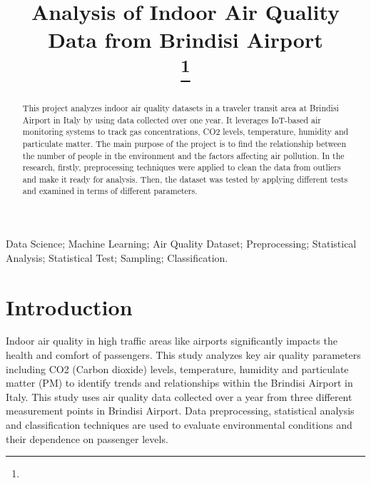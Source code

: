 \documentclass[conference]{IEEEtran}
\begin{document}
\title{Analysis of Indoor Air Quality Data from Brindisi Airport \\
{\footnotesize \textsuperscript{}
}
\thanks{}
}

\author{
\and
{}
\and
{}
}

\maketitle

\begin{abstract}
This project analyzes indoor air quality datasets in a traveler transit area at Brindisi Airport in Italy by using data collected over one year. It leverages IoT-based air monitoring systems to track gas concentrations, CO2 levels, temperature, humidity and particulate matter. The main purpose of the project is to find the relationship between the number of people in the environment and the factors affecting air pollution. In the research, firstly, preprocessing techniques were applied to clean the data from outliers and make it ready for analysis. Then, the dataset was tested by applying different tests and examined in terms of different parameters.
\vspace{1mm}
\end{abstract}

\begin{IEEEkeywords}
Data Science; Machine Learning; Air Quality Dataset; Preprocessing; Statistical Analysis; Statistical Test; Sampling; Classification.
\end{IEEEkeywords}

\section{Introduction}
Indoor air quality in high traffic areas like airports significantly impacts the health and comfort of passengers. This study analyzes key air quality parameters including CO2 (Carbon dioxide) levels, temperature, humidity and particulate matter (PM) to identify trends and relationships within the Brindisi Airport in Italy. This study uses air quality data collected over a year from three different measurement points in Brindisi Airport. Data preprocessing, statistical analysis and classification techniques are used to evaluate environmental conditions and their dependence on passenger levels.
\end{document}
